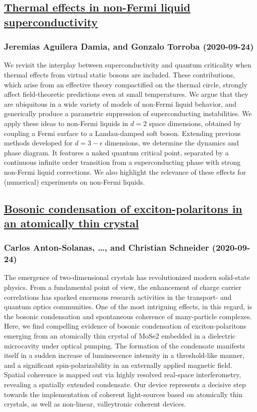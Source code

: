 \subsection*{\href{http://arxiv.org/abs/2009.11887v1}{Thermal effects in non-Fermi liquid superconductivity}}
\subsubsection*{Jeremias Aguilera Damia, and Gonzalo Torroba (2020-09-24)}
We revisit the interplay between superconductivity and quantum criticality
when thermal effects from virtual static bosons are included. These
contributions, which arise from an effective theory compactified on the thermal
circle, strongly affect field-theoretic predictions even at small temperatures.
We argue that they are ubiquitous in a wide variety of models of non-Fermi
liquid behavior, and generically produce a parametric suppression of
superconducting instabilities. We apply these ideas to non-Fermi liquids in
$d=2$ space dimensions, obtained by coupling a Fermi surface to a Landau-damped
soft boson. Extending previous methods developed for $d=3-\epsilon$ dimensions,
we determine the dynamics and phase diagram. It features a naked quantum
critical point, separated by a continuous infinite order transition from a
superconducting phase with strong non-Fermi liquid corrections. We also
highlight the relevance of these effects for (numerical) experiments on
non-Fermi liquids.

\subsection*{\href{http://arxiv.org/abs/2009.11885v1}{Bosonic condensation of exciton-polaritons in an atomically thin crystal}}
\subsubsection*{Carlos Anton-Solanas, \dots, and Christian Schneider (2020-09-24)}
The emergence of two-dimensional crystals has revolutionized modern
solid-state physics. From a fundamental point of view, the enhancement of
charge carrier correlations has sparked enormous research activities in the
transport- and quantum optics communities. One of the most intriguing effects,
in this regard, is the bosonic condensation and spontaneous coherence of
many-particle complexes. Here, we find compelling evidence of bosonic
condensation of exciton-polaritons emerging from an atomically thin crystal of
MoSe2 embedded in a dielectric microcavity under optical pumping. The formation
of the condensate manifests itself in a sudden increase of luminescence
intensity in a threshold-like manner, and a significant spin-polarizability in
an externally applied magnetic field. Spatial coherence is mapped out via
highly resolved real-space interferometry, revealing a spatially extended
condensate. Our device represents a decisive step towards the implementation of
coherent light-sources based on atomically thin crystals, as well as
non-linear, valleytronic coherent devices.

